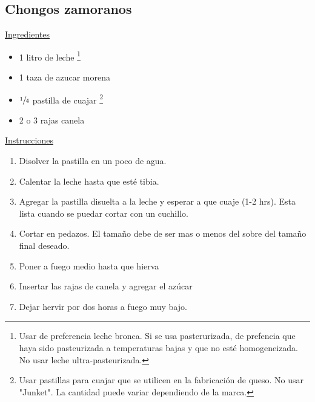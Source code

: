 \subsection{Chongos zamoranos}

\underline{Ingredientes}

\begin{itemize}
\item 1 litro de leche \footnote{Usar de preferencia leche bronca. Si se usa pasterurizada, de prefencia que haya sido pasteurizada a temperaturas bajas y que no esté homogeneizada. No usar leche ultra-pasteurizada.}
\item 1 taza de azucar morena
\item $\sfrac{1}{4}$ pastilla de cuajar \footnote{Usar pastillas para cuajar que se utilicen en la fabricación de queso. No usar "Junket". La cantidad puede variar dependiendo de la marca.}
\item 2 o 3 rajas canela
\end{itemize}

\underline{Instrucciones}
\begin{enumerate}
\item Disolver la pastilla en un poco de agua.
\item Calentar la leche hasta que esté tibia.
\item Agregar la pastilla disuelta a la leche y esperar a que cuaje (1-2 hrs). Esta lista cuando se puedar cortar con un cuchillo.
\item Cortar en  pedazos. El tamaño debe de ser mas o menos del sobre del tamaño final deseado.
\item Poner a fuego medio hasta que hierva
\item Insertar las rajas de canela y agregar el azúcar
\item Dejar hervir por dos horas a fuego muy bajo.
\end{enumerate}